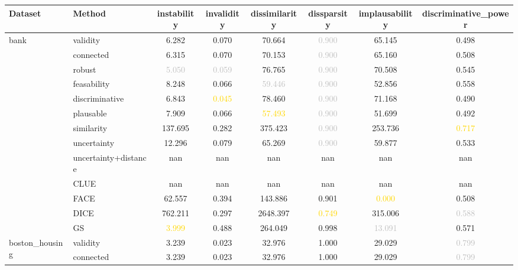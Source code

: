 \begin{table}[ht]
\centering
\begin{tabular}{l l c c c c c c}
\hline
Dataset & Method & instability & invalidity & dissimilarity & dissparsity & implausability & discriminative_power \\
\hline
\multirow{13}{*}{bank} & validity & \textcolor{bronze}{6.282} & 0.070 & 70.664 & \textcolor{silver}{0.900} & 65.145 & 0.498 \\
 & connected & 6.315 & 0.070 & 70.153 & \textcolor{silver}{0.900} & 65.160 & 0.508 \\
 & robust & \textcolor{silver}{5.050} & \textcolor{silver}{0.059} & 76.765 & \textcolor{silver}{0.900} & 70.508 & 0.545 \\
 & feasability & 8.248 & \textcolor{bronze}{0.066} & \textcolor{silver}{59.446} & \textcolor{silver}{0.900} & 52.856 & 0.558 \\
 & discriminative & 6.843 & \textcolor{gold}{0.045} & 78.460 & \textcolor{silver}{0.900} & 71.168 & 0.490 \\
 & plausable & 7.909 & 0.066 & \textcolor{gold}{57.493} & \textcolor{silver}{0.900} & \textcolor{bronze}{51.699} & 0.492 \\
 & similarity & 137.695 & 0.282 & 375.423 & \textcolor{silver}{0.900} & 253.736 & \textcolor{gold}{0.717} \\
 & uncertainty & 12.296 & 0.079 & \textcolor{bronze}{65.269} & \textcolor{silver}{0.900} & 59.877 & 0.533 \\
 & uncertainty+distance & nan & nan & nan & nan & nan & nan \\
 & CLUE & nan & nan & nan & nan & nan & nan \\
 & FACE & 62.557 & 0.394 & 143.886 & \textcolor{bronze}{0.901} & \textcolor{gold}{0.000} & 0.508 \\
 & DICE & 762.211 & 0.297 & 2648.397 & \textcolor{gold}{0.749} & 315.006 & \textcolor{silver}{0.588} \\
 & GS & \textcolor{gold}{3.999} & 0.488 & 264.049 & 0.998 & \textcolor{silver}{13.091} & \textcolor{bronze}{0.571} \\
\hline
\multirow{13}{*}{boston_housing} & validity & 3.239 & 0.023 & 32.976 & \textcolor{bronze}{1.000} & 29.029 & \textcolor{silver}{0.799} \\
 & connected & 3.239 & 0.023 & 32.976 & \textcolor{bronze}{1.000} & 29.029 & \textcolor{silver}{0.799} \\

\end{tabular}
\end{table}
